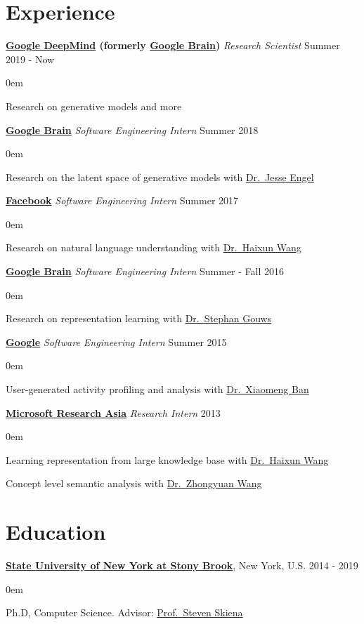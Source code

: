 \documentclass[line,margin]{cv}
\makeatletter
\newenvironment{block}
{
	\begin{addmargin}[2em]{0em}%
}
{
	\end{addmargin}
}
\newcommand{\SUNY}{\href{http://www.stonybrook.edu/}{State University of New York at Stony Brook}}
\newcommand{\Google}{\href{https://www.google.com/}{Google}}
\newcommand{\GoogleBrain}{\href{http://research.google.com/teams/brain/}{Google Brain}}
\newcommand{\GoogleDeepMind}{\href{https://www.deepmind.com/}{Google DeepMind}}
\newcommand{\Facebook}{\href{https://www.facebook.com/}{Facebook}}
\newcommand{\MyMail}{\href{mailto:alan.yt.tian@gmail.com}{alan.yt.tian@gmail.com}}
\newcommand{\MSRA}{\href{http://research.microsoft.com/en-us/labs/asia/default.aspx}{Microsoft Research Asia}}
\newcommand{\Haixun}{\href{http://haixun.olidu.com/}{Dr.\ Haixun Wang}}
\newcommand{\Zhongyuan}{\href{http://www.wangzhongyuan.com/}{Dr.\ Zhongyuan Wang}}
\newcommand{\Xiaomeng}{\href{https://www.linkedin.com/in/xiaomengban/}{Dr.\ Xiaomeng Ban}}
\newcommand{\Skiena}{\href{https://www3.cs.stonybrook.edu/~skiena/}{Prof.\ Steven Skiena}}
\newcommand{\sgouws}{\href{http://research.google.com/pubs/StephanGouws.html}{Dr.\ Stephan Gouws}}
\newcommand{\jesseengel}{\href{https://ai.google/research/people/JesseEngel}{Dr.\ Jesse Engel}}
\makeatother
\begin{document}

\address{\textit{E-mail:} \MyMail}

\begin{resume}

\section{Experience}

	{\bf \GoogleDeepMind{} (formerly \GoogleBrain)} {\itshape Research Scientist} \hfill Summer 2019 - Now
	\begin{block}
		Research on generative models and more
	\end{block}

	{\bf \GoogleBrain} {\itshape Software Engineering Intern} \hfill Summer 2018
	\begin{block}
		Research on the latent space of generative models with \jesseengel
	\end{block}

	{\bf \Facebook} {\itshape Software Engineering Intern} \hfill Summer 2017
	\begin{block}
		Research on natural language understanding with \Haixun
	\end{block}

	{\bf \GoogleBrain} {\itshape Software Engineering Intern} \hfill Summer - Fall 2016
	\begin{block}
		Research on representation learning with \sgouws
	\end{block}

	{\bf \Google} {\itshape Software Engineering Intern} \hfill Summer 2015
	\begin{block}
		User-generated activity profiling and analysis with \Xiaomeng
	\end{block}

	{\bf \MSRA} {\itshape Research Intern} \hfill 2013

	\begin{block}
		Learning representation from large knowledge base with \Haixun

		Concept level semantic analysis with \Zhongyuan
	\end{block}

\section{Education}

	{\bf \SUNY}, New York, U.S. \hfill 2014 - 2019
	\begin{block}
		Ph.D, Computer Science. Advisor: \Skiena
	\end{block}


\end{resume}
\end{document}

